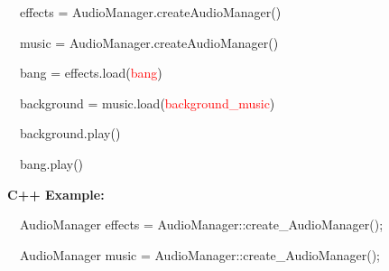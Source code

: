 \documentclass[a4paper]{article}
\newcommand\textstyleOOoComputerKeyWord[1]{\textrm{\textcolor[rgb]{0.0,0.0,0.5019608}{#1}}}
\newcommand\textstyleOOoComputerIdent[1]{\textrm{\textcolor[rgb]{0.0,0.5019608,0.0}{#1}}}
\newcommand\textstyleOOoComputerBase[1]{\textrm{\textcolor{black}{#1}}}
\newcommand\textstyleOOoComputerLiteral[1]{\textrm{\textcolor{red}{#1}}}
\begin{document}
{\ttfamily\color{black}
\ \ \textstyleOOoComputerIdent{effects} \textstyleOOoComputerBase{=}
\textstyleOOoComputerIdent{AudioManager}\textstyleOOoComputerBase{.}\textstyleOOoComputerIdent{createAudioManager}\textstyleOOoComputerBase{()}}

{\ttfamily\color{black}
\ \ \textstyleOOoComputerIdent{music} \textstyleOOoComputerBase{=}
\textstyleOOoComputerIdent{AudioManager}\textstyleOOoComputerBase{.}\textstyleOOoComputerIdent{createAudioManager}\textstyleOOoComputerBase{()}}


\bigskip

{\ttfamily\color{black}
\ \ \textstyleOOoComputerIdent{bang} \textstyleOOoComputerBase{=}
\textstyleOOoComputerIdent{effects}\textstyleOOoComputerBase{.}\textstyleOOoComputerIdent{load}\textstyleOOoComputerBase{(}\textstyleOOoComputerLiteral{{\textquotedbl}bang{\textquotedbl}}\textstyleOOoComputerBase{)}}

{\ttfamily\color{black}
\ \ \textstyleOOoComputerIdent{background} \textstyleOOoComputerBase{=}
\textstyleOOoComputerIdent{music}\textstyleOOoComputerBase{.}\textstyleOOoComputerIdent{load}\textstyleOOoComputerBase{(}\textstyleOOoComputerLiteral{{\textquotedbl}background\_music{\textquotedbl}}\textstyleOOoComputerBase{)}}


\bigskip

{\ttfamily\color{black}
\ \ \textstyleOOoComputerIdent{background}\textstyleOOoComputerBase{.}\textstyleOOoComputerIdent{play}\textstyleOOoComputerBase{()}}

{\ttfamily\color{black}
\ \ \textstyleOOoComputerIdent{bang}\textstyleOOoComputerBase{.}\textstyleOOoComputerIdent{play}\textstyleOOoComputerBase{()}}


\bigskip

\clearpage
\bigskip

{\bfseries
\hypertarget{RefHeading4110869075401}{}C++ Example:}

{\ttfamily\color{black}
\ \ \textstyleOOoComputerIdent{AudioManager} \textstyleOOoComputerIdent{effects} \textstyleOOoComputerKeyWord{=}
\textstyleOOoComputerIdent{AudioManager}\textstyleOOoComputerKeyWord{::}\textstyleOOoComputerIdent{create\_AudioManager}\textstyleOOoComputerKeyWord{();}}

{\ttfamily\color{black}
\ \ \textstyleOOoComputerIdent{AudioManager} \textstyleOOoComputerIdent{music} \textstyleOOoComputerKeyWord{=}
\textstyleOOoComputerIdent{AudioManager}\textstyleOOoComputerKeyWord{::}\textstyleOOoComputerIdent{create\_AudioManager}\textstyleOOoComputerKeyWord{();}}
\end{document}

